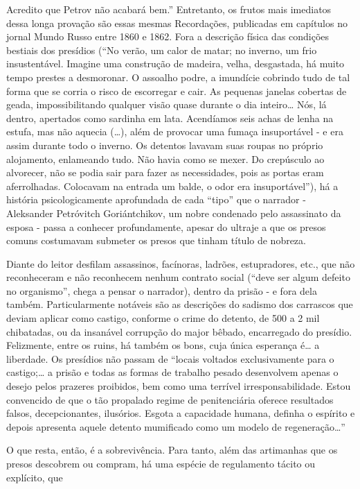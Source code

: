 Acredito que Petrov não acabará bem.'' Entretanto, os frutos mais
imediatos dessa longa provação são essas mesmas Recordações, publicadas
em capítulos no jornal Mundo Russo entre 1860 e 1862. Fora a descrição
física das condições bestiais dos presídios (``No verão, um calor de
matar; no inverno, um frio insustentável. Imagine uma construção de
madeira, velha, desgastada, há muito tempo prestes a desmoronar. O
assoalho podre, a imundície cobrindo tudo de tal forma que se corria o
risco de escorregar e cair. As pequenas janelas cobertas de geada,
impossibilitando qualquer visão quase durante o dia inteiro\ldots{} Nós, lá
dentro, apertados como sardinha em lata. Acendíamos seis achas de lenha
na estufa, mas não aquecia (\ldots{}), além de provocar uma fumaça
insuportável - e era assim durante todo o inverno. Os detentos lavavam
suas roupas no próprio alojamento, enlameando tudo. Não havia como se
mexer. Do crepúsculo ao alvorecer, não se podia sair para fazer as
necessidades, pois as portas eram aferrolhadas. Colocavam na entrada um
balde, o odor era insuportável''), há a história psicologicamente
aprofundada de cada ``tipo'' que o narrador - Aleksander Petróvitch
Goriántchikov, um nobre condenado pelo assassinato da esposa - passa a
conhecer profundamente, apesar do ultraje a que os presos comuns
costumavam submeter os presos que tinham título de nobreza.

Diante do leitor desfilam assassinos, facínoras, ladrões, estupradores,
etc., que não reconheceram e não reconhecem nenhum contrato social
(``deve ser algum defeito no organismo'', chega a pensar o narrador),
dentro da prisão - e fora dela também. Particularmente notáveis são as
descrições do sadismo dos carrascos que deviam aplicar como castigo,
conforme o crime do detento, de 500 a 2 mil chibatadas, ou da insanável
corrupção do major bêbado, encarregado do presídio. Felizmente, entre os
ruins, há também os bons, cuja única esperança é\ldots{} a liberdade. Os
presídios não passam de ``locais voltados exclusivamente para o
castigo;\ldots{} a prisão e todas as formas de trabalho pesado desenvolvem
apenas o desejo pelos prazeres proibidos, bem como uma terrível
irresponsabilidade. Estou convencido de que o tão propalado regime de
penitenciária oferece resultados falsos, decepcionantes, ilusórios.
Esgota a capacidade humana, definha o espírito e depois apresenta aquele
detento mumificado como um modelo de regeneração\ldots{}''

O que resta, então, é a sobrevivência. Para tanto, além das artimanhas
que os presos descobrem ou compram, há uma espécie de regulamento tácito
ou explícito, que

